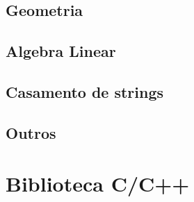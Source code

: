 \documentclass[a4paper,twocolumn, 10pt, landscape]{article}
\begin{document}
\subsection{Geometria}







\subsection{Algebra Linear}


\subsection{Casamento de strings}


\subsection{Outros}





\section{Biblioteca C/C++}
\end{document}
